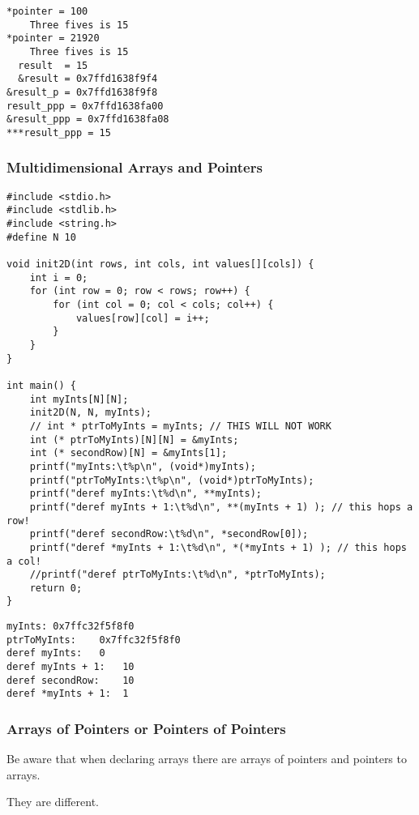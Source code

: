 \documentclass[11pt]{article}
\begin{document}
\begin{verbatim}
*pointer = 100
    Three fives is 15
*pointer = 21920
    Three fives is 15
  result  = 15
  &result = 0x7ffd1638f9f4
&result_p = 0x7ffd1638f9f8
result_ppp = 0x7ffd1638fa00
&result_ppp = 0x7ffd1638fa08
***result_ppp = 15
\end{verbatim}
\subsubsection{Multidimensional Arrays and Pointers}
\label{sec:org9b694c7}
\begin{verbatim}
#include <stdio.h>
#include <stdlib.h>
#include <string.h>
#define N 10

void init2D(int rows, int cols, int values[][cols]) {
    int i = 0;
    for (int row = 0; row < rows; row++) {
        for (int col = 0; col < cols; col++) {
            values[row][col] = i++;
        }
    }
}

int main() {
    int myInts[N][N];
    init2D(N, N, myInts);
    // int * ptrToMyInts = myInts; // THIS WILL NOT WORK
    int (* ptrToMyInts)[N][N] = &myInts;
    int (* secondRow)[N] = &myInts[1];
    printf("myInts:\t%p\n", (void*)myInts);
    printf("ptrToMyInts:\t%p\n", (void*)ptrToMyInts);
    printf("deref myInts:\t%d\n", **myInts); 
    printf("deref myInts + 1:\t%d\n", **(myInts + 1) ); // this hops a row!
    printf("deref secondRow:\t%d\n", *secondRow[0]);
    printf("deref *myInts + 1:\t%d\n", *(*myInts + 1) ); // this hops a col!
    //printf("deref ptrToMyInts:\t%d\n", *ptrToMyInts);    
    return 0;
}
\end{verbatim}

\begin{verbatim}
myInts:	0x7ffc32f5f8f0
ptrToMyInts:	0x7ffc32f5f8f0
deref myInts:	0
deref myInts + 1:	10
deref secondRow:	10
deref *myInts + 1:	1
\end{verbatim}


\subsubsection{Arrays of Pointers or Pointers of Pointers}
\label{sec:orga889717}

Be aware that when declaring arrays there are arrays of pointers and
pointers to arrays.

They are different.
\end{document}
